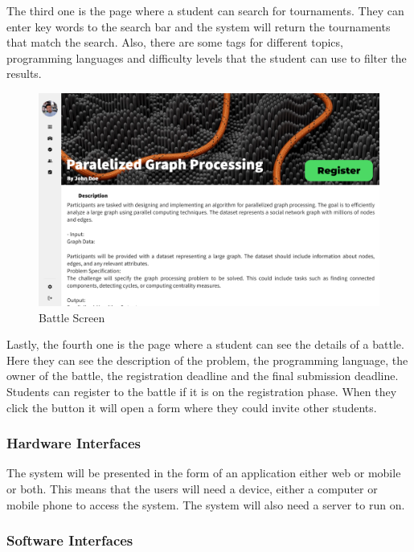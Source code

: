 \documentclass{article}
\begin{document}
The third one is the page where a student can search for tournaments. They can enter key words to the
search bar and the system will return the tournaments that match the search. Also, there are some tags for
different topics, programming languages and difficulty levels that the student can use to filter the results.

\begin{figure}[!h]
    \centering
    \includegraphics[width=1\textwidth]{images/UI/Battle Screen}
    \caption{Battle Screen}
    \label{fig:BattleScreen}
\end{figure}

\newpage

Lastly, the fourth one is the page where a student can see the details of a battle. Here they can see the description
of the problem, the programming language, the owner of the battle, the registration deadline and the final submission deadline.
Students can register to the battle if it is on the registration phase. When they click the button it will open a form where
they could invite other students.

\subsubsection{Hardware Interfaces}

The system will be presented in the form of an application either web or mobile or both. This means that the users
will need a device, either a computer or mobile phone to access the system. The system will also need a server to run on.

\subsubsection{Software Interfaces}
\end{document}
